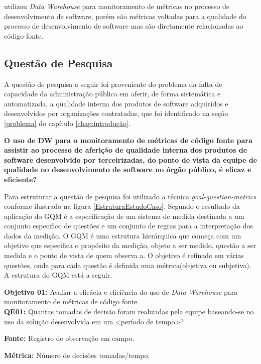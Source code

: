  utilizou \textit{Data Warehouse} para monitoramento de métricas no processo de desenvolvimento de software, porém são métricas voltadas para a qualidade do processo de desenvolvimento de software mas são diretamente relacionadas ao código-fonte. 

\subsection{Questão de Pesquisa}

A questão de pesquisa a seguir foi proveniente do problema da falta de capacidade da administração pública em aferir, de forma sistemática e automatizada, a qualidade interna dos produtos de software adquiridos e desenvolvidos por organizações contratadas, que foi identificado na seção \ref{problema} do capítulo \ref{chap:introdução}. 

\textbf{O uso de DW para o monitoramento de métricas de código fonte para assistir ao processo de aferição de qualidade interna dos produtos de software desenvolvido por terceirizadas, do ponto de vista da equipe de qualidade no desenvolvimento de software no órgão público, é eficaz e eficiente?}

Para estruturar a questão de pesquisa foi utilizado a técnica \textit{goal-question-metrics} conforme ilustrado na figura \ref{EstruturaEstudoCaso}. Segundo \cite{Basili96b} o resultado da aplicação do GQM é a especificação de um sistema de medida destinada a um conjunto especifico de questões e um conjunto de regras para a interpretação dos dados da medição. O GQM é uma estrutura hierárquica que começa com um objetivo que especifica o propósito da medição, objeto a ser medido, questão a ser medida e o ponto de vista de quem observa a. O objetivo é refinado em várias questões, onde para cada questão é definida uma métrica(objetiva ou subjetiva)\cite{Basili96b}. A estrutura do GQM está a seguir.

\textbf{Objetivo 01:} Avaliar a eficácia e eficiência do uso de \textit{Data Warehouse} para monitoramento de métricas de código fonte.\\



\textbf{QE01:} Quantas tomadas de decisão foram realizadas pela equipe baseando-se no uso da solução desenvolvida em um <período de tempo>?

\textbf{Fonte:} Registro de observação em campo.

\textbf{Métrica:} Número de decisões tomadas/tempo. \\


